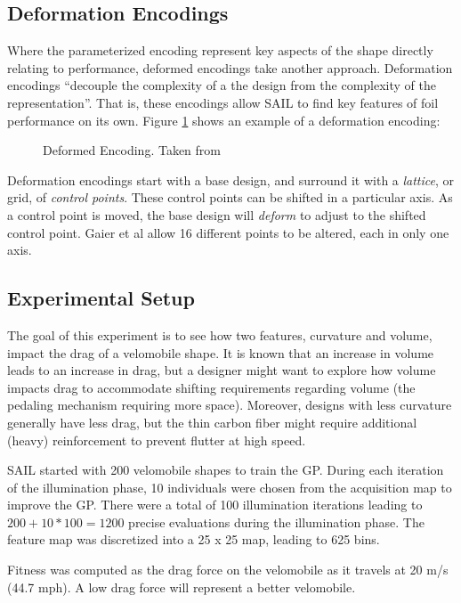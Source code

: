\documentclass{sig-alternate}
\begin{document}
\subsection{Deformation Encodings}
Where the parameterized encoding represent key aspects of the shape directly relating to performance, deformed encodings take another approach.
Deformation encodings ``decouple the complexity of a the design from the complexity of the representation''\cite{Gaier:2018}.
That is, these encodings allow SAIL to find key features of foil performance on its own.
Figure \ref{fig:Deformation} shows an example of a deformation encoding:

\begin{figure}[htb]
\centering
{}
\caption{Deformed Encoding. Taken from \cite{Gaier:2018}}
\label{fig:Deformation}
\end{figure}

Deformation encodings start with a base design, and surround it with a \textit{lattice}, or grid, of \textit{control points}.
These control points can be shifted in a particular axis.
As a control point is moved, the base design will \textit{deform} to adjust to the shifted control point.
Gaier et al allow  16 different points to be altered, each in only one axis.

\subsection{Experimental Setup}
The goal of this experiment is to see how two features, curvature and volume, impact the drag of a velomobile shape.
It is known that an increase in volume leads to an increase in drag, but a designer might want to explore how volume impacts drag to accommodate shifting requirements regarding volume (the pedaling mechanism requiring more space).
Moreover, designs with less curvature generally have less drag, but the thin carbon fiber might require additional (heavy) reinforcement to prevent flutter at high speed. 

SAIL started with 200 velomobile shapes to train the GP. During each iteration of the illumination phase, 10 individuals were chosen from the acquisition map to improve the GP.
There were a total of 100 illumination iterations leading to $200 + 10*100=1200$ precise evaluations during the illumination phase.
The feature map was discretized into a 25 x 25 map, leading to 625 bins. 

Fitness was computed as the drag force on the velomobile as it travels at 20 m/s (44.7 mph).
A low drag force will represent a better velomobile.
\end{document}
